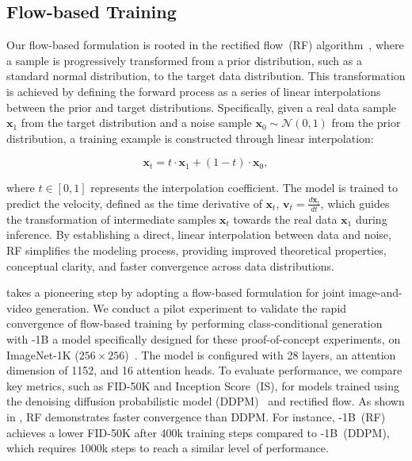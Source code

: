\subsection{Flow-based Training}\label{sec:method-flow}
Our flow-based formulation is rooted in the rectified flow~(RF) algorithm~\citep{albergo2023building, lipman2023flow, liu2023flow}, where a sample is progressively transformed from a prior distribution, such as a standard normal distribution, to the target data distribution. This transformation is achieved by defining the forward process as a series of linear interpolations between the prior and target distributions. Specifically, given a real data sample $\mathbf{x}_1$ from the target distribution and a noise sample $\mathbf{x}_0 \sim \mathcal{N}(0, 1)$ from the prior distribution, a training example is constructed through linear interpolation:

\begin{equation}\label{eq:flow-formulation}
\mathbf{x}_t = t \cdot \mathbf{x}_1 + (1 - t) \cdot \mathbf{x}_0,
\end{equation}

\noindent where $t \in [0, 1]$ represents the interpolation coefficient. The model is trained to predict the velocity, defined as the time derivative of $\mathbf{x}_t$, $\mathbf{v}_t = \frac{d\mathbf{x}_t}{dt}$, which guides the transformation of intermediate samples $\mathbf{x}_t$ towards the real data $\mathbf{x}_1$ during inference. By establishing a direct, linear interpolation between data and noise, RF simplifies the modeling process, providing improved theoretical properties, conceptual clarity, and faster convergence across data distributions.

\ours takes a pioneering step by adopting a flow-based formulation for joint image-and-video generation.
We conduct a pilot experiment to validate the rapid convergence of flow-based training by performing class-conditional generation with \ours-1B a model specifically designed for these proof-of-concept experiments, on ImageNet-1K ($256 \times 256$)~\citep{deng2009imagenet}. The model is configured with 28 layers, an attention dimension of 1152, and 16 attention heads. To evaluate performance, we compare key metrics, such as FID-50K and Inception Score~(IS), for models trained using the denoising diffusion probabilistic model (DDPM)~\citep{ho2020denoising} and rectified flow.  As shown in , RF demonstrates  faster convergence than DDPM. For instance, \ours-1B~(RF) achieves a lower FID-50K after 400k training steps compared to \ours-1B~(DDPM), which requires 1000k steps to reach a similar level of performance.



